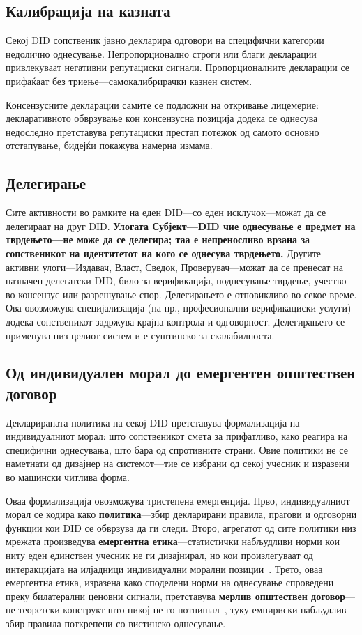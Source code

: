 \documentclass[11pt,a4paper,twocolumn]{article}
\begin{document}
\subsection{Калибрација на казната}

Секој DID сопственик јавно декларира одговори на специфични категории недолично однесување. Непропорционално строги или благи декларации привлекуваат негативни репутациски сигнали. Пропорционалните декларации се прифаќаат без триење---самокалибрирачки казнен систем.

Консензусните декларации самите се подложни на откривање лицемерие: декларативното обврзување кон консензусна позиција додека се однесува недоследно претставува репутациски престап потежок од самото основно отстапување, бидејќи покажува намерна измама.

\subsection{Делегирање}

Сите активности во рамките на еден DID---со еден исклучок---можат да се делегираат на друг DID. \textbf{Улогата Субјект---DID чие однесување е предмет на тврдењето---не може да се делегира; таа е непреносливо врзана за сопственикот на идентитетот на кого се однесува тврдењето.} Другите активни улоги---Издавач, Власт, Сведок, Проверувач---можат да се пренесат на назначен делегатски DID, било за верификација, поднесување тврдење, учество во консензус или разрешување спор. Делегирањето е отповикливо во секое време. Ова овозможува специјализација (на пр., професионални верификациски услуги) додека сопственикот задржува крајна контрола и одговорност. Делегирањето се применува низ целиот систем и е суштинско за скалабилноста.

\subsection{Од индивидуален морал до емергентен општествен договор}

Декларираната политика на секој DID претставува формализација на индивидуалниот морал: што сопственикот смета за прифатливо, како реагира на специфични однесувања, што бара од спротивните страни. Овие политики не се наметнати од дизајнер на системот---тие се избрани од секој учесник и изразени во машински читлива форма.

Оваа формализација овозможува тристепена емергенција. Прво, индивидуалниот морал се кодира како \textbf{политика}---збир декларирани правила, прагови и одговорни функции кои DID се обврзува да ги следи. Второ, агрегатот од сите политики низ мрежата произведува \textbf{емергентна етика}---статистички набљудливи норми кои ниту еден единствен учесник не ги дизајнирал, но кои произлегуваат од интеракцијата на илјадници индивидуални морални позиции~\cite{durkheim1893}. Трето, оваа емергентна етика, изразена како споделени норми на однесување спроведени преку билатерални ценовни сигнали, претставува \textbf{мерлив општествен договор}---не теоретски конструкт што никој не го потпишал~\cite{rawls1971}, туку емпириски набљудлив збир правила поткрепени со вистинско однесување.
\end{document}
